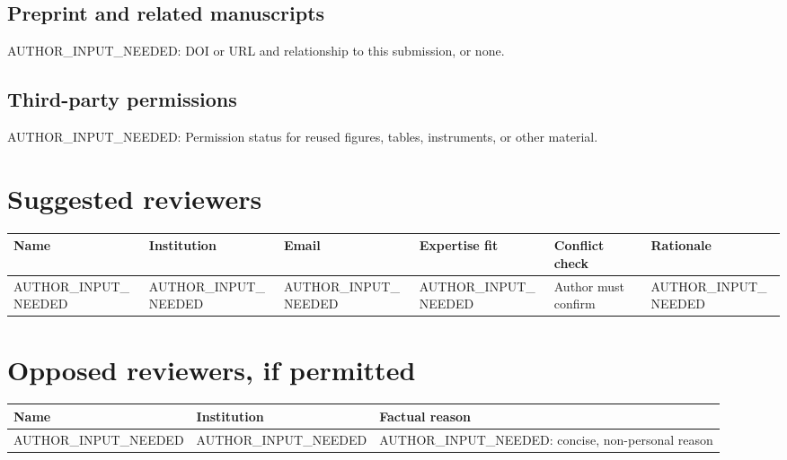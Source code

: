 \documentclass[10pt]{article}
\begin{document}
\subsection*{Preprint and related manuscripts}
AUTHOR\_INPUT\_NEEDED: DOI or URL and relationship to this submission, or none.

\subsection*{Third-party permissions}
AUTHOR\_INPUT\_NEEDED: Permission status for reused figures, tables, instruments, or other material.

\section*{Suggested reviewers}

\begin{longtable}{>{\raggedright\arraybackslash}p{}
                  >{\raggedright\arraybackslash}p{}
                  >{\raggedright\arraybackslash}p{}
                  >{\raggedright\arraybackslash}p{}
                  >{\raggedright\arraybackslash}p{}
                  >{\raggedright\arraybackslash}p{}}
\textbf{Name} & \textbf{Institution} & \textbf{Email} &
\textbf{Expertise fit} & \textbf{Conflict check} & \textbf{Rationale}\\
\hline
AUTHOR\_INPUT\_NEEDED & AUTHOR\_INPUT\_NEEDED & AUTHOR\_INPUT\_NEEDED &
AUTHOR\_INPUT\_NEEDED & Author must confirm & AUTHOR\_INPUT\_NEEDED\\
\end{longtable}

\section*{Opposed reviewers, if permitted}

\begin{longtable}{>{\raggedright\arraybackslash}p{}
                  >{\raggedright\arraybackslash}p{}
                  >{\raggedright\arraybackslash}p{}}
\textbf{Name} & \textbf{Institution} & \textbf{Factual reason}\\
\hline
AUTHOR\_INPUT\_NEEDED & AUTHOR\_INPUT\_NEEDED &
AUTHOR\_INPUT\_NEEDED: concise, non-personal reason\\
\end{longtable}
\end{document}
